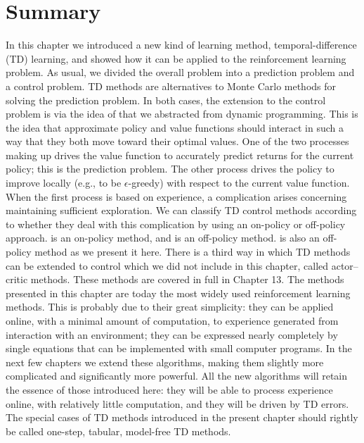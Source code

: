 \section{Summary}
In this chapter we introduced a new kind of learning method, temporal-difference (TD)
learning, and showed how it can be applied to the reinforcement learning problem.
As usual, we divided the overall problem into a prediction problem and a control problem.
TD methods are alternatives to Monte Carlo methods for solving the prediction problem.
In both cases, the extension to the control problem is via the idea of 
that we abstracted from dynamic programming.
This is the idea that approximate policy and value functions should interact in such a way that
they both move toward their optimal values.
One of the two processes making up   drives the value function to accurately
predict returns for the current policy; this is the prediction problem.
The other process drives the policy to improve locally (e.g., to be $\epsilon$-greedy) with
respect to the current value function.
When the first process is based on experience, a complication arises concerning
maintaining sufficient exploration.
We can classify TD control methods according to whether they deal with this complication by
using an on-policy or off-policy approach.
 is an on-policy method, and
 is an off-policy method.
 is also an off-policy method as we present it here.
There is a third way in which TD methods can be extended to control which we did not include in
this chapter, called actor–critic methods.
These methods are covered in full in Chapter 13.
The methods presented in this chapter are today the most widely used reinforcement
learning methods.
This is probably due to their great simplicity: they can be applied online, with a minimal amount
of computation, to experience generated from interaction with an environment; they can be expressed
nearly completely by single equations that can be implemented with small computer programs.
In the next few chapters we extend these algorithms, making them slightly more complicated and
significantly more powerful.
All the new algorithms will retain the essence of those introduced here: they will be able
to process experience online, with relatively little computation, and they will be driven
by TD errors.
The special cases of TD methods introduced in the present chapter should rightly be called
one-step, tabular, model-free TD methods.
